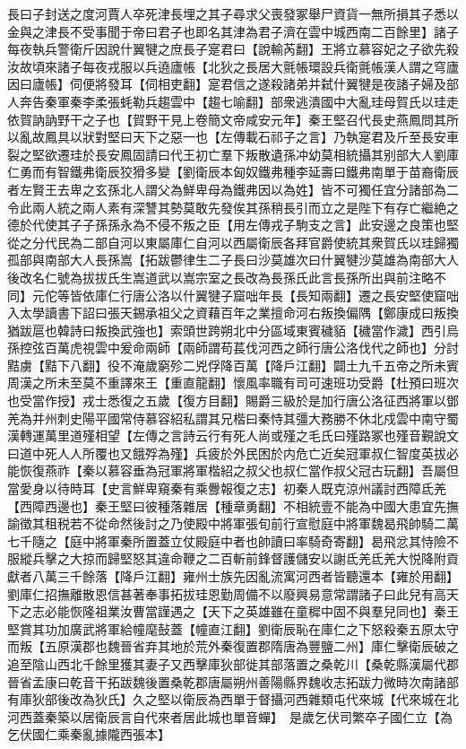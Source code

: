 長曰子封送之度河賈人卒死津長埋之其子尋求父喪發冢舉尸資貨一無所損其子悉以金與之津長不受事聞于帝曰君子也即名其津為君子濟在雲中城西南二百餘里】諸子每夜執兵警衛斤因說什翼犍之庶長子寔君曰【說輸芮翻】王將立慕容妃之子欲先殺汝故頃來諸子每夜戎服以兵遶廬帳【北狄之長居大氈帳環設兵衛氈帳漢人謂之穹廬因曰廬帳】伺便將發耳【伺相吏翻】寔君信之遂殺諸弟并弑什翼犍是夜諸子婦及部人奔告秦軍秦李柔張蚝勒兵趨雲中【趨七喻翻】部衆逃潰國中大亂珪母賀氏以珪走依賀訥訥野干之子也【賀野干見上卷簡文帝咸安元年】秦王堅召代長史燕鳳問其所以亂故鳳具以狀對堅曰天下之惡一也【左傳載石祁子之言】乃執寔君及斤至長安車裂之堅欲遷珪於長安鳳固請曰代王初亡羣下叛散遺孫冲幼莫相統攝其别部大人劉庫仁勇而有智鐵弗衛辰狡猾多變【劉衛辰本匈奴鐵弗種李延壽曰鐵弗南單于苗裔衛辰者左賢王去卑之玄孫北人謂父為鮮卑母為鐵弗因以為姓】皆不可獨任宜分諸部為二令此兩人統之兩人素有深讐其勢莫敢先發俟其孫稍長引而立之是陛下有存亡繼絶之德於代使其子子孫孫永為不侵不叛之臣【用左傳戎子駒支之言】此安邊之良策也堅從之分代民為二部自河以東屬庫仁自河以西屬衛辰各拜官爵使統其衆賀氏以珪歸獨孤部與南部大人長孫嵩【拓跋鬱律生二子長曰沙莫雄次曰什翼犍沙莫雄為南部大人後改名仁號為拔拔氏生嵩道武以嵩宗室之長改為長孫氏此言長孫所出與前注略不同】元佗等皆依庫仁行唐公洛以什翼犍子窟咄年長【長知兩翻】遷之長安堅使窟咄入太學讀書下詔曰張天錫承祖父之資藉百年之業擅命河右叛換偏隅【鄭康成曰叛換猶跋扈也韓詩曰叛換武強也】索頭世跨朔北中分區域東賓穢貊【穢當作濊】西引烏孫控弦百萬虎視雲中爰命兩師【兩師謂苟萇伐河西之師行唐公洛伐代之師也】分討黠虜【黠下八翻】役不淹歲窮殄二兇俘降百萬【降戶江翻】闢土九千五帝之所未賓周漢之所未至莫不重譯來王【重直龍翻】懷風率職有司可速班功受爵【杜預曰班次也受當作授】戎士悉復之五歲【復方目翻】賜爵三級於是加行唐公洛征西將軍以鄧羌為并州刺史陽平國常侍慕容紹私謂其兄楷曰秦恃其彊大務勝不休北戍雲中南守蜀漢轉運萬里道殣相望【左傳之言詩云行有死人尚或殣之毛氏曰殣路冢也殣音覲說文曰道中死人人所覆也又餓殍為殣】兵疲於外民困於内危亡近矣冠軍叔仁智度英拔必能恢復燕祚【秦以慕容垂為冠軍將軍楷紹之叔父也叔仁當作叔父冠古玩翻】吾屬但當愛身以待時耳【史言鮮卑窺秦有乘釁報復之志】初秦人既克涼州議討西障氐羌【西障西邊也】秦王堅曰彼種落雜居【種章勇翻】不相統壹不能為中國大患宜先撫諭徵其租税若不從命然後討之乃使殿中將軍張旬前行宣慰庭中將軍魏曷飛帥騎二萬七千隨之【庭中將軍秦所置蓋立仗殿庭中者也帥讀曰率騎奇寄翻】曷飛忿其恃險不服縱兵擊之大掠而歸堅怒其違命鞭之二百斬前鋒督護儲安以謝氐羌氐羌大悦降附貢獻者八萬三千餘落【降戶江翻】雍州士族先因亂流寓河西者皆聽還本【雍於用翻】劉庫仁招撫離散恩信甚著奉事拓拔珪恩勤周備不以廢興易意常謂諸子曰此兒有高天下之志必能恢隆祖業汝曹當謹遇之【天下之英雄雖在童穉中固不與羣兒同也】秦王堅賞其功加廣武將軍給幢麾鼔蓋【幢直江翻】劉衛辰恥在庫仁之下怒殺秦五原太守而叛【五原漢郡也魏晉省弃其地於荒外秦復置郡隋唐為豐鹽二州】庫仁擊衛辰破之追至陰山西北千餘里獲其妻子又西擊庫狄部徙其部落置之桑乾川【桑乾縣漢屬代郡晉省孟康曰乾音干拓跋魏後置桑乾郡唐屬朔州善陽縣界魏收志拓跋力微時次南諸部有庫狄部後改為狄氏】久之堅以衛辰為西單于督攝河西雜類屯代來城【代來城在北河西蓋秦築以居衛辰言自代來者居此城也單音蟬】　是歲乞伏司繁卒子國仁立【為乞伏國仁乘秦亂據隴西張本】

